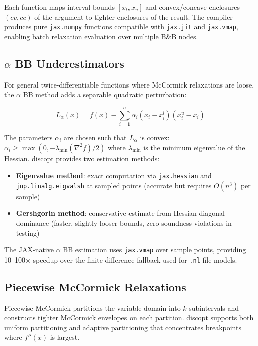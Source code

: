 \documentclass[12pt,preprint]{article}
\begin{document}
Each function maps interval bounds $[x_l, x_u]$ and convex/concave enclosures $(cv, cc)$ of the argument to tighter enclosures of the result. The compiler produces pure \texttt{jax.numpy} functions compatible with \texttt{jax.jit} and \texttt{jax.vmap}, enabling batch relaxation evaluation over multiple B\&B nodes.

\subsection{$\alpha$ BB Underestimators}
\label{org-alpha-bb-underestimators}
For general twice-differentiable functions where McCormick relaxations are loose, the $\alpha$ BB method \cite{Androulakis1995,Adjiman1998} adds a separable quadratic perturbation:


\begin{equation}
L_{\alpha}(x) = f(x) - \sum_{i=1}^n \alpha_i (x_i - x_i^l)(x_i^u - x_i)
\end{equation}


The parameters $\alpha_i$ are chosen such that $L_\alpha$ is convex: $\alpha_i \ge \max(0, -\lambda_{\min}(\nabla^2 f) / 2)$ where $\lambda_{\min}$ is the minimum eigenvalue of the Hessian. discopt provides two estimation methods:


\begin{itemize}
\item \textbf{Eigenvalue method}: exact computation via \texttt{jax.hessian} and \texttt{jnp.linalg.eigvalsh} at sampled points (accurate but requires $O(n^3)$ per sample)

\item \textbf{Gershgorin method}: conservative estimate from Hessian diagonal dominance (faster, slightly looser bounds, zero soundness violations in testing)

\end{itemize}


The JAX-native $\alpha$ BB estimation uses \texttt{jax.vmap} over sample points, providing 10--100$\times$ speedup over the finite-difference fallback used for \texttt{.nl} file models.

\subsection{Piecewise McCormick Relaxations}
\label{org-piecewise-mccormick-relaxations}
Piecewise McCormick \cite{Castro2015} partitions the variable domain into $k$ subintervals and constructs tighter McCormick envelopes on each partition. discopt supports both uniform partitioning and adaptive partitioning that concentrates breakpoints where $f''(x)$ is largest.
\end{document}
